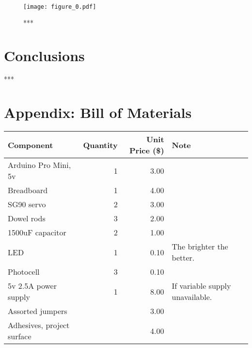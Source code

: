 \documentclass{article}
\begin{document}
		\begin{figure}[h]
			\begin{center}
				\texttt{[image: figure\_0.pdf]}
				\caption{***}
			\end{center}
		\end{figure}

	

	
	\section{Conclusions}

	***
	
	\section{Appendix: Bill of Materials}
	

	\begin{center}
		\begin{tabular}{ l r r  p{5cm} }
			\hline
			Component & Quantity & Unit Price (\$) & Note \\ \hline
			Arduino Pro Mini, 5v & 1 & 3.00 &  \\ 
			Breadboard & 1 & 4.00 & \\
			SG90 servo & 2 & 3.00 & \\ 
			Dowel rods & 3 & 2.00 & \\
			1500uF capacitor & 2 & 1.00 & \\ 
			LED & 1 & 0.10 & The brighter the better.\\ 
			Photocell & 3 & 0.10 & \\ 
			5v 2.5A power supply & 1 & 8.00 & If variable supply unavailable. \\ 
			Assorted jumpers & & 3.00 & \\
			Adhesives, project surface & & 4.00 & \\
			\hline
		\end{tabular}
	\end{center}
	
	
\end{document}
